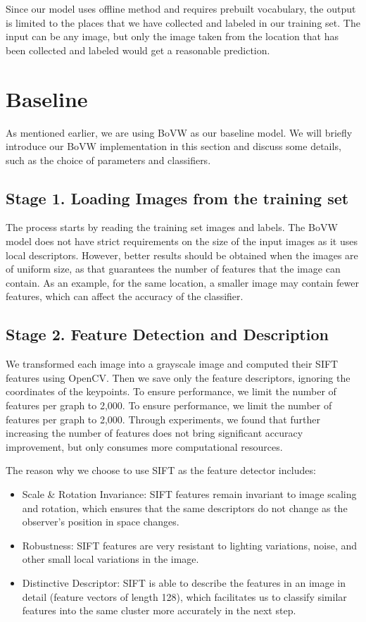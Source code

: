 \documentclass[conference]{IEEEtran}
\begin{document}
Since our model uses offline method and requires prebuilt vocabulary, the output is limited to the places that we have collected and labeled in our training set. The input can be any image, but only the image taken from the location that has been collected and labeled would get a reasonable prediction.

\section{Baseline}

As mentioned earlier, we are using BoVW as our baseline model. We will briefly introduce our BoVW implementation in this section and discuss some details, such as the choice of parameters and classifiers.

\subsection*{Stage 1. Loading Images from the training set}

The process starts by reading the training set images and labels. The BoVW model does not have strict requirements on the size of the input images as it uses local descriptors. However, better results should be obtained when the images are of uniform size, as that guarantees the number of features that the image can contain. As an example, for the same location, a smaller image may contain fewer features, which can affect the accuracy of the classifier.

\subsection*{Stage 2. Feature Detection and Description}

We transformed each image into a grayscale image and computed their SIFT features using OpenCV. Then we save only the feature descriptors, ignoring the coordinates of the keypoints. To ensure performance, we limit the number of features per graph to 2,000. To ensure performance, we limit the number of features per graph to 2,000. Through experiments, we found that further increasing the number of features does not bring significant accuracy improvement, but only consumes more computational resources.

The reason why we choose to use SIFT as the feature detector includes:

\begin{itemize}
    \item Scale \& Rotation Invariance: SIFT features remain invariant to image scaling and rotation, which ensures that the same descriptors do not change as the observer's position in space changes.
    \item Robustness: SIFT features are very resistant to lighting variations, noise, and other small local variations in the image.
    \item Distinctive Descriptor: SIFT is able to describe the features in an image in detail (feature vectors of length 128), which facilitates us to classify similar features into the same cluster more accurately in the next step.
\end{itemize}
\end{document}
